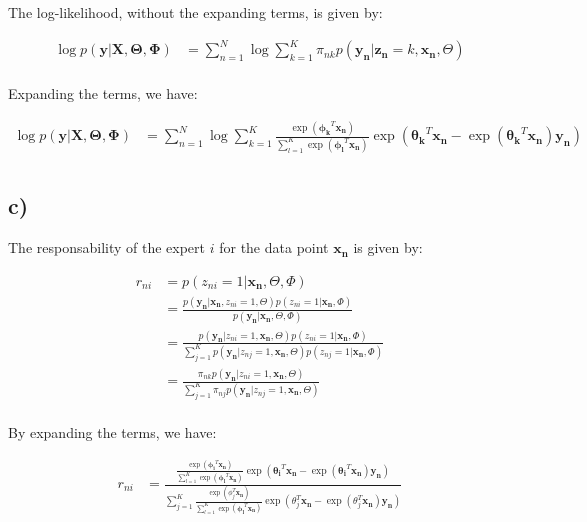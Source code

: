 \documentclass[12pt,a4paper,oneside]{paper}
\begin{document}
The log-likelihood, without the expanding terms, is given by:

\begin{align*}
    \log p(\bm{y} | \bm{X}, \bm{\Theta}, \bm{\Phi}) &= \sum_{n=1}^{N} \log \sum_{k=1}^{K} \pi_{nk} p(\bm{y_n} | \bm{z_n} = k, \bm{x_n}, \Theta) \\
\end{align*}

Expanding the terms, we have:

\begin{align*}
    \log p(\bm{y} | \bm{X}, \bm{\Theta}, \bm{\Phi}) &= \sum_{n=1}^{N} \log \sum_{k=1}^{K} \frac{\exp(\bm{\phi_k}^T \bm{x_n})}{\sum_{l=1}^{K} \exp(\bm{\phi_l}^T \bm{x_n})} \exp(\bm{\theta_k}^T \bm{x_n} -\exp(\bm{\theta_k}^T \bm{x_n}) \bm{y_n}) \\
\end{align*}

\subsection*{c)}

The responsability of the expert $i$ for the data point $\bm{x_n}$ is given by:

\begin{align*}
    r_{ni} &= p(z_{ni} = 1 | \bm{x_n}, \Theta, \Phi) \\
    &= \frac{p(\bm{y_n} | \bm{x_n}, z_{ni} = 1, \Theta) p(z_{ni} = 1 | \bm{x_n}, \Phi)}{p(\bm{y_n} | \bm{x_n}, \Theta, \Phi)} \\
    &= \frac{p(\bm{y_n} | z_{ni} = 1, \bm{x_n}, \Theta) p(z_{ni} = 1 | \bm{x_n}, \Phi)}{\sum_{j=1}^{K} p(\bm{y_n} | z_{nj} = 1, \bm{x_n}, \Theta) p(z_{nj} = 1 | \bm{x_n}, \Phi)} \\
    &= \frac{\pi_{nk} p(\bm{y_n} | z_{ni} = 1, \bm{x_n}, \Theta)}{\sum_{j=1}^{K} \pi_{nj} p(\bm{y_n} | z_{nj} = 1, \bm{x_n}, \Theta)} \\
\end{align*}

By expanding the terms, we have:

\begin{align*}
    r_{ni} &= \frac{\frac{\exp(\bm{\phi_i}^T \bm{x_n})}{\sum_{l=1}^{K} \exp(\bm{\phi_l}^T \bm{x_n})} \exp(\bm{\theta_i}^T \bm{x_n} -\exp(\bm{\theta_i}^T \bm{x_n}) \bm{y_n})}{\sum_{j=1}^{K} \frac{\exp(\phi_j^T \bm{x_n})}{\sum_{l=1}^{K} \exp(\bm{\phi_l}^T \bm{x_n})} \exp(\theta_j^T \bm{x_n} -\exp(\theta_j^T \bm{x_n}) \bm{y_n})} \\
\end{align*}
\end{document}
